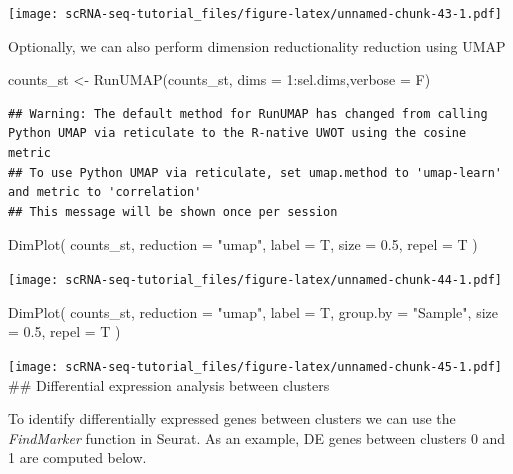 \documentclass[
]{book}
\newenvironment{Shaded}{\begin{snugshade}}{\end{snugshade}}
\newcommand{\AttributeTok}[1]{\textcolor[rgb]{0.77,0.63,0.00}{#1}}
\newcommand{\DecValTok}[1]{\textcolor[rgb]{0.00,0.00,0.81}{#1}}
\newcommand{\FloatTok}[1]{\textcolor[rgb]{0.00,0.00,0.81}{#1}}
\newcommand{\FunctionTok}[1]{\textcolor[rgb]{0.00,0.00,0.00}{#1}}
\newcommand{\NormalTok}[1]{#1}
\newcommand{\OtherTok}[1]{\textcolor[rgb]{0.56,0.35,0.01}{#1}}
\newcommand{\SpecialCharTok}[1]{\textcolor[rgb]{0.00,0.00,0.00}{#1}}
\newcommand{\StringTok}[1]{\textcolor[rgb]{0.31,0.60,0.02}{#1}}
\begin{document}
\texttt{[image: scRNA-seq-tutorial\_files/figure-latex/unnamed-chunk-43-1.pdf]}

Optionally, we can also perform dimension reductionality reduction using UMAP

\begin{Shaded}
\begin{Highlighting}[]
\NormalTok{counts\_st }\OtherTok{\textless{}{-}} \FunctionTok{RunUMAP}\NormalTok{(counts\_st, }\AttributeTok{dims =} \DecValTok{1}\SpecialCharTok{:}\NormalTok{sel.dims,}\AttributeTok{verbose =}\NormalTok{ F)}
\end{Highlighting}
\end{Shaded}

\begin{verbatim}
## Warning: The default method for RunUMAP has changed from calling Python UMAP via reticulate to the R-native UWOT using the cosine metric
## To use Python UMAP via reticulate, set umap.method to 'umap-learn' and metric to 'correlation'
## This message will be shown once per session
\end{verbatim}

\begin{Shaded}
\begin{Highlighting}[]
\FunctionTok{DimPlot}\NormalTok{(}
\NormalTok{  counts\_st,}
  \AttributeTok{reduction =} \StringTok{"umap"}\NormalTok{,}
  \AttributeTok{label =}\NormalTok{ T,}
  \AttributeTok{size =} \FloatTok{0.5}\NormalTok{,}
  \AttributeTok{repel =}\NormalTok{ T}
\NormalTok{)}
\end{Highlighting}
\end{Shaded}

\texttt{[image: scRNA-seq-tutorial\_files/figure-latex/unnamed-chunk-44-1.pdf]}

\begin{Shaded}
\begin{Highlighting}[]
\FunctionTok{DimPlot}\NormalTok{(}
\NormalTok{  counts\_st,}
  \AttributeTok{reduction =} \StringTok{"umap"}\NormalTok{,}
  \AttributeTok{label =}\NormalTok{ T,}
  \AttributeTok{group.by =} \StringTok{"Sample"}\NormalTok{,}
  \AttributeTok{size =} \FloatTok{0.5}\NormalTok{,}
  \AttributeTok{repel =}\NormalTok{ T}
\NormalTok{)}
\end{Highlighting}
\end{Shaded}

\texttt{[image: scRNA-seq-tutorial\_files/figure-latex/unnamed-chunk-45-1.pdf]}
\#\# Differential expression analysis between clusters

To identify differentially expressed genes between clusters we can use the \emph{FindMarker} function in Seurat. As an example, DE genes between clusters 0 and 1 are computed below.
\end{document}
